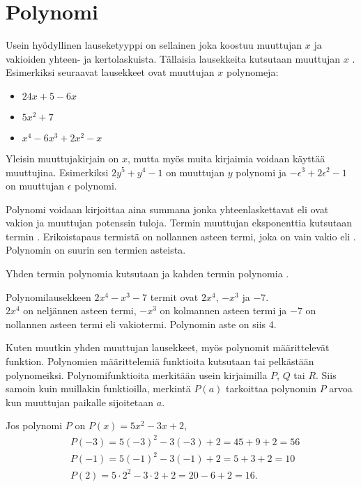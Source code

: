 \chapter{Polynomi}
Usein hyödyllinen lauseketyyppi on sellainen joka koostuu muuttujan $x$ ja
vakioiden yhteen- ja kertolaskuista. Tällaisia lausekkeita kutsutaan muuttujan
$x$ . Esimerkiksi seuraavat lausekkeet ovat muuttujan $x$ polynomeja:
\begin{itemize}
\item $24x + 5 - 6x$
\item $5x^2+7$
\item $x^4-6x^3+2x^2-x$
\end{itemize}

Yleisin muuttujakirjain on $x$, mutta myös muita kirjaimia voidaan käyttää
muuttujina. Esimerkiksi $2y^5+y^4-1$ on muuttujan $y$ polynomi ja
$-\epsilon^3+2\epsilon^2-1$ on muuttujan $\epsilon$ polynomi.

Polynomi voidaan kirjoittaa aina summana jonka yhteenlaskettavat eli
 ovat vakion ja muuttujan potenssin tuloja. Termin muuttujan
eksponenttia kutsutaan termin . Erikoistapaus termistä on
nollannen asteen termi, joka on vain vakio eli . Polynomin
 on suurin sen termien asteista.

Yhden termin polynomia kutsutaan  ja kahden termin polynomia
.

\begin{esimerkki}
Polynomilausekkeen $2x^4-x^3-7$ termit ovat $2x^4$, $-x^3$ ja $-7$. \\
$2x^4$ on neljännen asteen termi, $-x^3$ on kolmannen asteen termi ja $-7$ on nollannen
asteen termi eli vakiotermi. Polynomin aste on siis 4.

\end{esimerkki}

Kuten muutkin yhden muuttujan lausekkeet, myös polynomit määrittelevät
funktion. Polynomien määrittelemiä funktioita kutsutaan
 tai pelkästään polynomeiksi. Polynomifunktioita
merkitään usein kirjaimilla $P$, $Q$ tai $R$. Siis samoin kuin muillakin
funktioilla, merkintä $P(a)$ tarkoittaa polynomin $P$ arvoa kun muuttujan
paikalle sijoitetaan $a$.

\begin{esimerkki}
Jos polynomi $P$ on $P(x) = 5x^2-3x+2$,
\begin{align*}
&P(-3) = 5(-3)^2-3(-3)+2 = 45 + 9 + 2 = 56 \\
&P(-1) = 5(-1)^2-3(-1)+2 = 5 + 3 + 2 = 10 \\
&P(2) = 5\cdot 2^2-3\cdot 2+2 = 20 - 6 + 2 = 16.
\end{align*}
\end{esimerkki}

